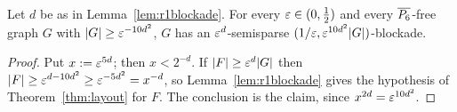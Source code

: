 \begin{lemma}[$P_6$ is nice]\label{lem:nice}
Let $d$ be as in Lemma~\ref{lem:r1blockade}. For every $\varepsilon\in(0,\frac12)$ and every $\overline{P_6}$-free graph $G$
with $|G|\ge\varepsilon^{-10d^2}$, $G$ has an $\varepsilon^d$-semisparse $(1/\varepsilon,\varepsilon^{10d^2}|G|)$-blockade.
\end{lemma}
\begin{proof}
Put $x:=\varepsilon^{5d}$; then $x<2^{-d}$. If $|F|\ge\varepsilon^d|G|$ then $|F|\ge\varepsilon^{d-10d^2}\ge\varepsilon^{-5d^2}=x^{-d}$, so
Lemma~\ref{lem:r1blockade} gives the hypothesis of Theorem~\ref{thm:layout} for $F$. The conclusion is the
claim, since $x^{2d}=\varepsilon^{10d^2}$.
\end{proof}
